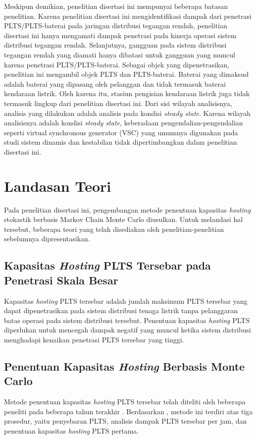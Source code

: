 {{{{{{Meskipun demikian, penelitian disertasi ini mempunyai beberapa batasan penelitian. Karena penelitian disertasi ini mengidentifikasi dampak dari penetrasi PLTS/PLTS-baterai pada jaringan distribusi tegangan rendah, penelitian disertasi ini hanya mengamati dampak penetrasi pada kinerja operasi sistem distribusi tegangan rendah. Selanjutnya, gangguan pada sistem distribusi tegangan rendah yang diamati hanya dibatasi untuk gangguan yang muncul karena penetrasi PLTS/PLTS-baterai. Sebagai objek yang dipenetrasikan, penelitian ini mengambil objek PLTS dan PLTS-baterai. Baterai yang dimaksud adalah baterai yang dipasang oleh pelanggan dan tidak termasuk baterai kendaraan listrik. Oleh karena itu, stasiun pengisian kendaraan listrik juga tidak termasuk lingkup dari penelitian disertasi ini. Dari sisi wilayah analisisnya, analisis yang dilakukan adalah analisis pada kondisi \textit{steady state}. Karena wilayah analisisnya adalah kondisi \textit{steady state}, keberadaan pengendalian-pengendalian seperti virtual synchronous generator (VSC) yang umumnya digunakan pada studi sistem dinamis dan kestabilan tidak dipertimbangkan dalam penelitian disertasi ini.

\section{Landasan Teori}
Pada penelitian disertasi ini, pengembangan metode penentuan kapasitas \textit{hosting} stokastik berbasis Markov Chain Monte Carlo diusulkan. Untuk melandasi hal tersebut, beberapa teori yang telah disediakan oleh penelitian-penelitian sebelumnya dipresentasikan.

\subsection{Kapasitas \textit{Hosting} PLTS Tersebar pada Penetrasi Skala Besar}
Kapasitas \textit{hosting} PLTS tersebar adalah jumlah maksimum PLTS tersebar yang dapat dipenetrasikan pada sistem distribusi tenaga listrik tanpa pelanggaran batas operasi pada sistem distribusi tersebut. Penentuan kapasitas \textit{hosting} PLTS diperlukan untuk mencegah dampak negatif yang muncul ketika sistem distribusi menghadapi kenaikan penetrasi PLTS tersebar yang tinggi. 

\subsection{Penentuan Kapasitas \textit{Hosting} Berbasis Monte Carlo}
Metode penentuan kapasitas \textit{hosting} PLTS tersebar telah diteliti oleh beberapa peneliti pada beberapa tahun terakhir \cite{Dubey2017,Torquato2018,Ding2017}. Berdasarkan \cite{Dubey2017}, metode ini terdiri atas tiga prosedur, yaitu penyebaran PLTS, analisis dampak PLTS tersebar per jam, dan penentuan kapasitas \textit{hosting} PLTS pertama.

}}}}}}
